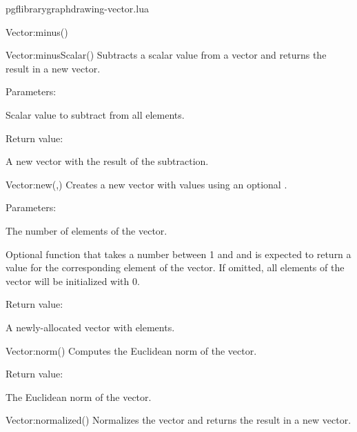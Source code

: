 \begin{filedescription}{pgflibrarygraphdrawing-vector.lua}
\begin{luacommand}{{Vector:minus}()}
\end{luacommand}
\begin{luacommand}{{Vector:minusScalar}()}
Subtracts a scalar value from a vector and returns the result in a new vector. 

Parameters:
\begin{parameterdescription}
	\item[\meta{scalar}] Scalar value to subtract from all elements. 
\end{parameterdescription}


Return value:
\begin{parameterdescription} 
  \item[] A new vector with the result of the subtraction. 
\end{parameterdescription}


\end{luacommand}
\begin{luacommand}{{Vector:new}(,)}
Creates a new vector with  values using an optional . 

Parameters:
\begin{parameterdescription}
	\item[\meta{n}] The number of elements of the vector.\item[\meta{fill\_function}] Optional function that takes a number between 1 and  and is expected to return a value for the corresponding element of the vector. If omitted, all elements of the vector will be initialized with 0. 
\end{parameterdescription}


Return value:
\begin{parameterdescription} 
  \item[] A newly-allocated vector with  elements. 
\end{parameterdescription}


\end{luacommand}
\begin{luacommand}{{Vector:norm}()}
Computes the Euclidean norm of the vector. 


Return value:
\begin{parameterdescription} 
  \item[] The Euclidean norm of the vector. 
\end{parameterdescription}


\end{luacommand}
\begin{luacommand}{{Vector:normalized}()}
Normalizes the vector and returns the result in a new vector. 



\end{luacommand}
\end{filedescription}
